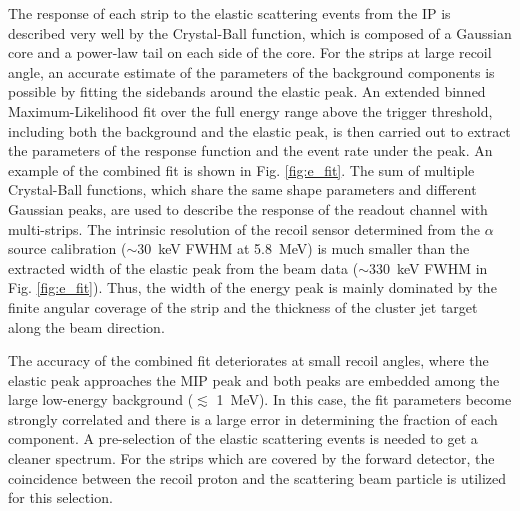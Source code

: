 \documentclass[number,5p]{elsarticle}
\begin{document}
The response of each strip to the elastic scattering events from the IP is described
very well by the Crystal-Ball function\cite{crystal_ball}, which is composed of a Gaussian core and a power-law tail on each side of the core.
For the strips at large recoil angle, an accurate estimate of the parameters of
the background components is possible by fitting the sidebands around the elastic peak.
An extended binned Maximum-Likelihood fit over the full energy range above the
trigger threshold, including both the background and the
elastic peak, is then carried out to extract the parameters of the response function and the event rate under the peak.
An example of the combined fit is shown in Fig. \ref{fig:e_fit}.
The sum of multiple Crystal-Ball functions, which share the same shape parameters and
different Gaussian peaks, are used to describe the response of the readout channel with multi-strips. 
The intrinsic resolution of the recoil sensor determined from the $\alpha$ source
calibration ($\sim$\SI{30}{\keV} FWHM at \SI{5.8}{\MeV}) is much smaller than the
extracted width of the elastic peak from the beam data ($\sim$\SI{330}{\keV}
FWHM in Fig. \ref{fig:e_fit}).
Thus, the width of the energy peak is mainly dominated by the finite
angular coverage of the strip and the thickness of the cluster jet target along the beam direction.

The accuracy of the combined fit deteriorates at small recoil angles, where the elastic peak approaches the MIP peak and both peaks are embedded among the large
low-energy background ($\lesssim$ \SI{1}{\MeV}).
In this case, the fit parameters become strongly correlated and there is a large error in determining the fraction of each component.
A pre-selection of the elastic scattering events is needed to get a cleaner spectrum.
For the strips which are covered by the forward detector, the coincidence between the recoil proton and the scattering beam particle is utilized for this selection.
\end{document}
